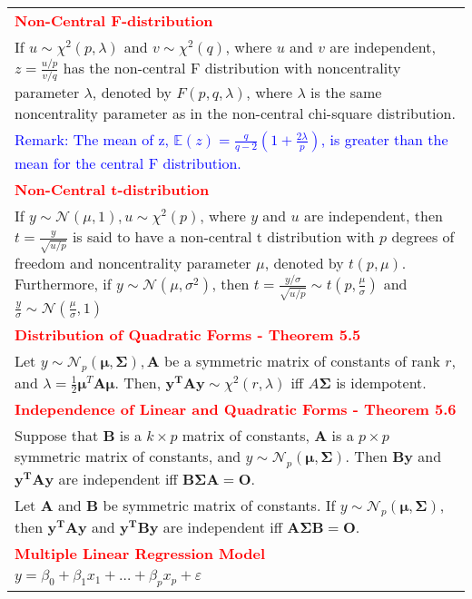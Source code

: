 \documentclass[a4paper,11pt]{article}
\begin{document}
\begin{longtable}{|p{17 cm}|}
\hline
\textcolor{red}{\textbf{Non-Central F-distribution}}\\
If $u \sim \chi^2(p, \lambda)$ and $v \sim \chi^2(q)$, where $u$ and $v$ are independent, $z=\frac{u/p}{v/q}$ has the non-central F distribution with noncentrality parameter $\lambda$, denoted by $F(p,q,\lambda)$, where $\lambda$ is the same noncentrality parameter as in the non-central chi-square distribution.\\
\textcolor{blue}{Remark: The mean of z, $\mathbb{E}(z) = \frac{q}{q-2}(1+\frac{2\lambda}{p})$, is greater than the mean for the central F distribution.}\\
\hline
\textcolor{red}{\textbf{Non-Central t-distribution}}\\
If $y \sim \mathcal{N}(\mu,1), u \sim \chi^2(p)$, where $y$ and $u$ are independent, then $t=\frac{y}{\sqrt{u/p}}$ is said to have a non-central t distribution with $p$ degrees of freedom and noncentrality parameter $\mu$, denoted by $t(p,\mu)$. Furthermore, if $y \sim \mathcal{N}(\mu,\sigma^2)$, then $t=\frac{y/\sigma}{\sqrt{u/p}}\sim t(p, \frac{\mu}{\sigma})$ and $\frac{y}{\sigma}\sim\mathcal{N}(\frac{\mu}{\sigma},1)$\\
\hline
\textcolor{red}{\textbf{Distribution of Quadratic Forms - Theorem 5.5}}\\
Let $y\sim \mathcal{N}_p(\boldsymbol{\mu},\boldsymbol{\Sigma}), \mathbf{A}$ be a symmetric matrix of constants of rank $r$, and $\lambda=\frac{1}{2}\boldsymbol{\mu}^T\mathbf{A}\boldsymbol{\mu}$. Then, $\mathbf{y^T Ay} \sim \chi^2(r, \lambda)$ iff $A\boldsymbol{\Sigma}$ is idempotent.\\
\hline
\textcolor{red}{\textbf{Independence of Linear and Quadratic Forms - Theorem 5.6}}\\
Suppose that $\mathbf{B}$ is a $k \times p$ matrix of constants, $\mathbf{A}$ is a $p \times p$ symmetric matrix of constants, and $y\sim \mathcal{N}_p(\boldsymbol{\mu},\boldsymbol{\Sigma})$. Then $\mathbf{By}$ and $\mathbf{y^T Ay}$ are independent iff $\mathbf{B\boldsymbol{\Sigma}A} = \mathbf{O}$.\\
Let $\mathbf{A}$ and $\mathbf{B}$ be symmetric matrix of constants. If $y \sim \mathcal{N}_p(\boldsymbol{\mu},\boldsymbol{\Sigma})$, then $\mathbf{y^T Ay}$ and $\mathbf{y^T By}$ are independent iff $\mathbf{A\boldsymbol{\Sigma}B}=\mathbf{O}$.\\
\hline
\textcolor{red}{\noindent\textbf{Multiple Linear Regression Model}}\\
$y=\beta_0+\beta_1x_1+\dots+\beta_px_p+\varepsilon$\\

\end{longtable}
\end{document}
